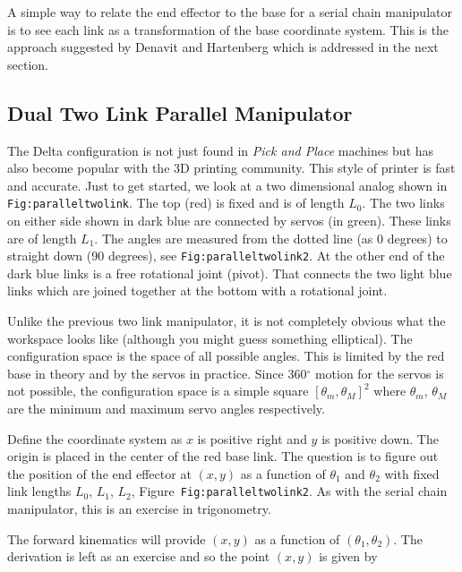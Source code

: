 A simple way to relate the end effector to the base for a serial chain
manipulator is to see each link as a transformation of the base
coordinate system. This is the approach suggested by Denavit and
Hartenberg which is addressed in the next section.

\hypertarget{dual-two-link-parallel-manipulator}{%
\subsection{Dual Two Link Parallel
Manipulator}\label{dual-two-link-parallel-manipulator}}

The Delta configuration is not just found in \emph{Pick and Place}
machines but has also become popular with the 3D printing community.
This style of printer is fast and accurate. Just to get started, we look
at a two dimensional analog shown in \texttt{Fig:paralleltwolink}. The
top (red) is fixed and is of length \(L_0\). The two links on either
side shown in dark blue are connected by servos (in green). These links
are of length \(L_1\). The angles are measured from the dotted line (as
0 degrees) to straight down (90 degrees), see
\texttt{Fig:paralleltwolink2}. At the other end of the dark blue links
is a free rotational joint (pivot). That connects the two light blue
links which are joined together at the bottom with a rotational joint.

Unlike the previous two link manipulator, it is not completely obvious
what the workspace looks like (although you might guess something
elliptical). The configuration space is the space of all possible
angles. This is limited by the red base in theory and by the servos in
practice. Since 360\(^\circ\) motion for the servos is not possible, the
configuration space is a simple square \([\theta_m , \theta_M]^2\) where
\(\theta_m\), \(\theta_M\) are the minimum and maximum servo angles
respectively.

Define the coordinate system as \(x\) is positive right and \(y\) is
positive down. The origin is placed in the center of the red base link.
The question is to figure out the position of the end effector at
\((x,y)\) as a function of \(\theta_1\) and \(\theta_2\) with fixed link
lengths \(L_0\), \(L_1\), \(L_2\), Figure~\texttt{Fig:paralleltwolink2}.
As with the serial chain manipulator, this is an exercise in
trigonometry.

The forward kinematics will provide \((x,y)\) as a function of
\((\theta_1, \theta_2)\). The derivation is left as an exercise and so
the point \((x,y)\) is given by

